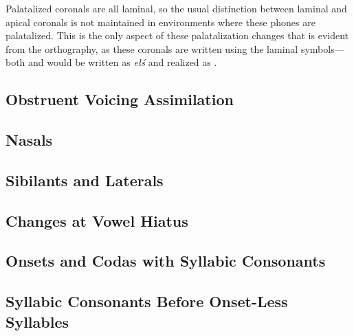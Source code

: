 \documentclass[a4paper,11pt,oneside,openany]{memoir}
\begin{document}
\begin{center}
\end{center}
\noindent Palatalized coronals are all laminal, so the usual distinction between laminal and apical coronals is not maintained in environments where these phones are palatalized. This is the only aspect of these palatalization changes that is evident from the orthography, as these coronals are written using the laminal symbols---both  and  would be written as \textit{e\l\'s} and realized as .

\subsection{Obstruent Voicing Assimilation}

\subsection{Nasals}

\subsection{Sibilants and Laterals}

\subsection{Changes at Vowel Hiatus}

\subsection{Onsets and Codas with Syllabic Consonants}

\subsection{Syllabic Consonants Before Onset-Less Syllables}
\end{document}
